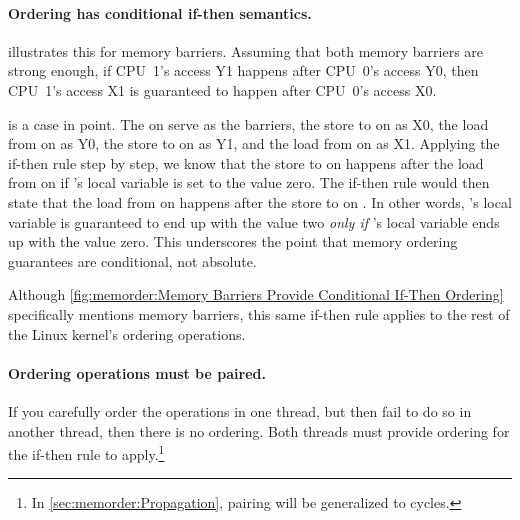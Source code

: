 \paragraph{Ordering has conditional if-then semantics.}
illustrates this for memory barriers.
Assuming that both memory barriers are strong enough, if CPU~1's access
Y1 happens after CPU~0's access Y0, then CPU~1's access X1 is guaranteed
to happen after CPU~0's access X0.

\QuickQuizEnd

\begin{fcvref}
is a case in point.
The  on  serve as the barriers,
the store to  on  as X0, the load from 
on  as Y0, the store to  on  as Y1,
and the load from  on  as X1.
Applying the if-then rule step by step, we know that the store to
 on  happens after the load from  on  if
's local variable  is set to the value zero.
The if-then rule would then state that the load from  on
 happens after the store to  on .
In other words,
's local variable  is guaranteed
to end up with the value two \emph{only if}
's local variable  ends up with the value zero.
This underscores the point that memory ordering guarantees are
conditional, not absolute.
\end{fcvref}

Although
\cref{fig:memorder:Memory Barriers Provide Conditional If-Then Ordering}
specifically mentions memory barriers, this same if-then rule applies
to the rest of the Linux kernel's ordering operations.

\paragraph{Ordering operations must be paired.}
If you carefully order the operations in one thread, but then fail to do
so in another thread, then there is no ordering.
Both threads must provide ordering for the if-then rule to apply.\footnote{
	In \cref{sec:memorder:Propagation}, pairing will be
	generalized to cycles.}

